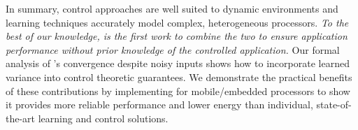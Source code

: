 In summary, control approaches are well suited to dynamic environments
and learning techniques accurately model complex, heterogeneous
processors.  \emph{To the best of our knowledge, \SYSTEM{} is the
  first work to combine the two to ensure application performance
  without prior knowledge of the controlled application.}  Our formal
analysis of \SYSTEM{}'s convergence despite noisy inputs shows how to
incorporate learned variance into control theoretic guarantees.  We
demonstrate the practical benefits of these contributions by
implementing \SYSTEM{} for mobile/embedded processors to show it
provides more reliable performance and lower energy than individual,
state-of-the-art learning and control solutions.


